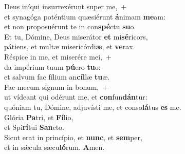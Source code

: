 \oddverse Deus iníqui insurrexérunt super me,~+\\
\oddverse  et synagóga poténtium quæsiérunt \textbf{á}nimam \textbf{me}am:~\*\\
\oddverse et non proposuérunt te in con\textbf{spé}ctu \textbf{su}o.\\
\evenverse Et tu, Dómine, Deus miserátor \textbf{et} mi\textbf{sé}ricors,~\*\\
\evenverse pátiens, et multæ misericórdi\textbf{æ}, et \textbf{ve}rax.\\
\oddverse Réspice in me, et miserére mei,~+\\
\oddverse  da impérium tuum \textbf{pú}ero \textbf{tu}o:~\*\\
\oddverse et salvum fac fílium an\textbf{cíl}læ \textbf{tu}æ.\\
\evenverse Fac mecum signum in bonum,~+\\
\evenverse  ut vídeant qui odérunt me, et \textbf{con}fun\textbf{dán}tur:~\*\\
\evenverse quóniam tu, Dómine, adjuvísti me, et conso\textbf{lá}tus \textbf{es} me.\\
\oddverse Glória \textbf{Pa}tri, et \textbf{Fí}lio,~\*\\
\oddverse et Spi\textbf{rí}tui \textbf{San}cto.\\
\evenverse Sicut erat in princípio, et \textbf{nunc}, et \textbf{sem}per,~\*\\
\evenverse et in sǽcula sæcu\textbf{ló}rum. \textbf{A}men.\\
